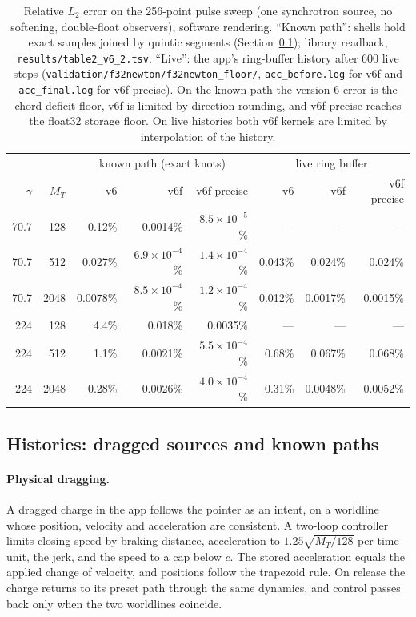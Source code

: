 \documentclass[11pt, a4paper]{article}
\begin{document}
\begin{table}[htbp]
\centering
\begin{tabular}{@{}rrrrrrrr@{}}
\toprule
& & \multicolumn{3}{c}{known path (exact knots)} & \multicolumn{3}{c}{live ring buffer} \\
$\gamma$ & $M_T$ & v6 & v6f & v6f precise & v6 & v6f & v6f precise \\
\midrule
70.7 & 128  & 0.12\%   & 0.0014\%             & $8.5\times10^{-5}$\% & ---     & ---      & ---      \\
70.7 & 512  & 0.027\%  & $6.9\times10^{-4}$\% & $1.4\times10^{-4}$\% & 0.043\% & 0.024\%  & 0.024\%  \\
70.7 & 2048 & 0.0078\% & $8.5\times10^{-4}$\% & $1.2\times10^{-4}$\% & 0.012\% & 0.0017\% & 0.0015\% \\
224  & 128  & 4.4\%    & 0.018\%              & 0.0035\%             & ---     & ---      & ---      \\
224  & 512  & 1.1\%    & 0.0021\%             & $5.5\times10^{-4}$\% & 0.68\%  & 0.067\%  & 0.068\%  \\
224  & 2048 & 0.28\%   & 0.0026\%             & $4.0\times10^{-4}$\% & 0.31\%  & 0.0048\% & 0.0052\% \\
\bottomrule
\end{tabular}
\caption{Relative $L_2$ error on the 256-point pulse sweep (one synchrotron source, no softening, double-float observers), software rendering. ``Known path'': shells hold exact samples joined by quintic segments (Section~\ref{sec:known}); library readback, \texttt{results/table2\_v6\_2.tsv}. ``Live'': the app's ring-buffer history after 600 live steps (\texttt{validation/f32newton/f32newton\_floor/}, \texttt{acc\_before.log} for v6f and \texttt{acc\_final.log} for v6f precise). On the known path the version-6 error is the chord-deficit floor, v6f is limited by direction rounding, and v6f precise reaches the float32 storage floor. On live histories both v6f kernels are limited by interpolation of the history.}
\label{tab:v6f}
\end{table}

\subsection{Histories: dragged sources and known paths}\label{sec:known}
\paragraph{Physical dragging.} A dragged charge in the app follows the pointer as an intent, on a worldline whose position, velocity and acceleration are consistent. A two-loop controller limits closing speed by braking distance, acceleration to $1.25\sqrt{M_T/128}$ per time unit, the jerk, and the speed to a cap below $c$. The stored acceleration equals the applied change of velocity, and positions follow the trapezoid rule. On release the charge returns to its preset path through the same dynamics, and control passes back only when the two worldlines coincide.
\end{document}

